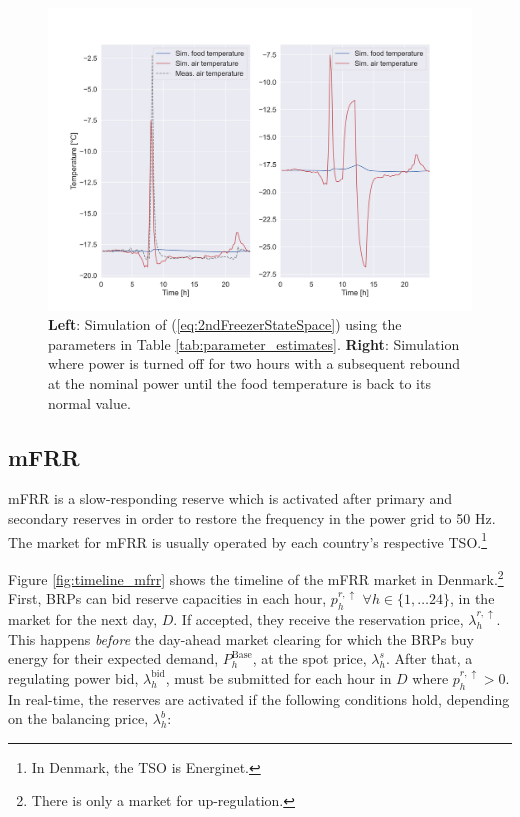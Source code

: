 \begin{figure}[!t]
    \centering
    \includegraphics[width=\columnwidth]{../figures/2ndFreezerModelSimulation.png}
    \caption{ \textbf{Left}: Simulation of (\ref{eq:2ndFreezerStateSpace}) using the parameters in Table \ref{tab:parameter_estimates}. \textbf{Right}: Simulation where power is turned off for two hours with a subsequent rebound at the nominal power until the food temperature is back to its normal value.}
    \label{fig:2ndFreezerModelSimulation}
\end{figure}


\subsection{mFRR}\label{sec:mFRR}

mFRR is a slow-responding reserve which is activated after primary and secondary reserves in order to restore the frequency in the power grid to 50 Hz. The market for mFRR is usually operated by each country's respective TSO.\footnote{In Denmark, the TSO is Energinet.}

Figure \ref{fig:timeline_mfrr} shows the timeline of the mFRR market in Denmark.\footnote{There is only a market for up-regulation.} First, BRPs can bid reserve capacities in each hour, $p_{h}^{r,\uparrow}$ $\forall{h} \in \{1, \ldots 24 \}$, in the market for the next day, $D$. If accepted, they receive the reservation price, $\lambda_{h}^{r,\uparrow}$. This happens \textit{before} the day-ahead market clearing for which the BRPs buy energy for their expected demand, $P_{h}^{\text{Base}}$, at the spot price, $\lambda_{h}^{s}$. After that, a regulating power bid, $\lambda_{h}^{\text{bid}}$, must be submitted for each hour in $D$ where $p_{h}^{r,\uparrow} > 0$. In real-time, the reserves are activated if the following conditions hold, depending on the balancing price, $\lambda_{h}^{b}$:

